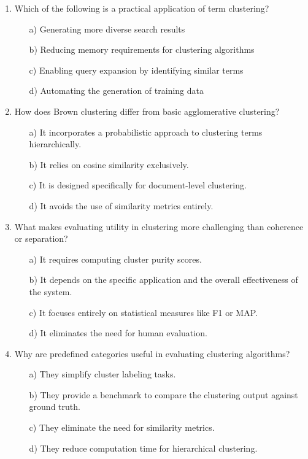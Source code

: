 \documentclass[8pt]{extarticle}
\begin{document}
\begin{multicols}{2}
\begin{enumerate}
\item Which of the following is a practical application of term clustering?
\begin{itemize}
\item[a)] Generating more diverse search results
\item[b)] Reducing memory requirements for clustering algorithms
\item[c)] Enabling query expansion by identifying similar terms
\item[d)] Automating the generation of training data
\end{itemize}

\item How does Brown clustering differ from basic agglomerative clustering?
\begin{itemize}
\item[a)] It incorporates a probabilistic approach to clustering terms hierarchically.
\item[b)] It relies on cosine similarity exclusively.
\item[c)] It is designed specifically for document-level clustering.
\item[d)] It avoids the use of similarity metrics entirely.
\end{itemize}

\item What makes evaluating utility in clustering more challenging than coherence or separation?
\begin{itemize}
\item[a)] It requires computing cluster purity scores.
\item[b)] It depends on the specific application and the overall effectiveness of the system.
\item[c)] It focuses entirely on statistical measures like F1 or MAP.
\item[d)] It eliminates the need for human evaluation.
\end{itemize}

\item Why are predefined categories useful in evaluating clustering algorithms?
\begin{itemize}
\item[a)] They simplify cluster labeling tasks.
\item[b)] They provide a benchmark to compare the clustering output against ground truth.
\item[c)] They eliminate the need for similarity metrics.
\item[d)] They reduce computation time for hierarchical clustering.
\end{itemize}


\end{enumerate}
\end{multicols}
\end{document}
